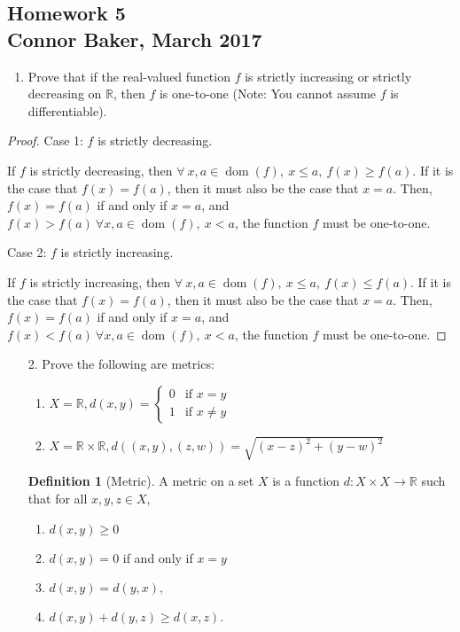 \documentclass[10pt]{article}
\theoremstyle{definition}
\newtheorem{definition}[equation]{Definition}
\theoremstyle{plain}
\newcommand{\R}{\mathbb{R}}
\DeclareMathOperator\dom{dom}
\begin{document}
\begin{center}
  \subsection*{Homework 5\\Connor Baker, March 2017}
\end{center}

\begin{enumerate}
\item Prove that if the real-valued function $f$ is strictly increasing or strictly decreasing on $\R$, then $f$ is one-to-one (Note:  You cannot assume $f$ is differentiable).
\end{enumerate}



\begin{proof}
  Case 1: $f$ is strictly decreasing.

  If $f$ is strictly decreasing, then $\forall\ x,a\in\dom(f),\ x\leq a,\ f(x) \geq f(a)$. If it is the case that $f(x)=f(a)$, then it must also be the case that $x=a$. Then, $f(x)=f(a)$ if and only if $x=a$, and $f(x) > f(a)\ \forall x,a\in\dom(f),\ x < a$, the function $f$ must be one-to-one.

  Case 2: $f$ is strictly increasing.

  If $f$ is strictly increasing, then $\forall\ x,a\in\dom(f),\ x\leq a,\ f(x) \leq f(a)$. If it is the case that $f(x)=f(a)$, then it must also be the case that $x=a$. Then, $f(x)=f(a)$ if and only if $x=a$, and $f(x) < f(a)\ \forall x,a\in\dom(f),\ x < a$, the function $f$ must be one-to-one.
\end{proof}



\pagebreak



\begin{enumerate}
  \item[2.] Prove the following are metrics:
  \begin{enumerate}
    \item $X = \R, d(x,y) =  \begin{cases} 0 & \mbox{if } x = y \\ 1 & \mbox{if } x \neq y \end{cases} $
    \item $X = \R \times \R, d((x,y),(z,w)) = \sqrt{(x-z)^2 + (y-w)^2}$
  \end{enumerate}
  \begin{definition}[Metric]
    A metric on a set $X$ is a function $d: X \times X \to \R$ such that for all $x,y,z \in X$,
  \end{definition}
  \begin{enumerate}
    \item $d(x,y) \geq 0$
    \item $d(x,y) = 0$ if and only if $x = y$
    \item $d(x,y) = d(y,x),$
    \item $d(x,y) + d(y,z) \geq d(x,z)$.
  \end{enumerate}
\end{enumerate}
\end{document}
